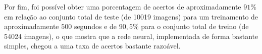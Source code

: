 Por fim, foi possível obter uma porcentagem de acertos de aproximadamente $91\%$ em relação ao conjunto total de teste (de 10019 imagens) para um treinamento de aproximadamente $500$ segundos e de $90,5$\% para o conjunto total de treino (de 54024 imagens), o que mostra que a rede neural, implementada de forma bastante simples, chegou a uma taxa de acertos bastante razoável.